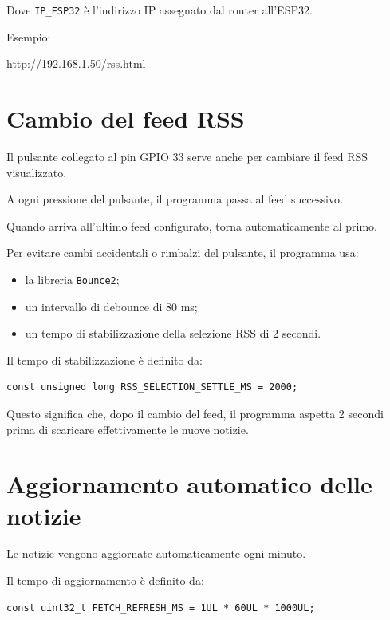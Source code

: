 \documentclass[11pt,a4paper]{article}
\begin{document}
	Dove \texttt{IP\_ESP32} è l'indirizzo IP assegnato dal router all'ESP32.
	
	Esempio:
	
	\begin{center}
		\url{http://192.168.1.50/rss.html}
	\end{center}
	
	\section{Cambio del feed RSS}
	
	Il pulsante collegato al pin GPIO 33 serve anche per cambiare il feed RSS visualizzato.
	
	A ogni pressione del pulsante, il programma passa al feed successivo.
	
	Quando arriva all'ultimo feed configurato, torna automaticamente al primo.
	
	Per evitare cambi accidentali o rimbalzi del pulsante, il programma usa:
	
	\begin{itemize}
		\item la libreria \texttt{Bounce2};
		\item un intervallo di debounce di 80 ms;
		\item un tempo di stabilizzazione della selezione RSS di 2 secondi.
	\end{itemize}
	
	Il tempo di stabilizzazione è definito da:
	
	\begin{lstlisting}[style=codice]
		const unsigned long RSS_SELECTION_SETTLE_MS = 2000;
	\end{lstlisting}
	
	Questo significa che, dopo il cambio del feed, il programma aspetta 2 secondi prima di scaricare effettivamente le nuove notizie.
	
	\section{Aggiornamento automatico delle notizie}
	
	Le notizie vengono aggiornate automaticamente ogni minuto.
	
	Il tempo di aggiornamento è definito da:
	
	\begin{lstlisting}[style=codice]
		const uint32_t FETCH_REFRESH_MS = 1UL * 60UL * 1000UL;
	\end{lstlisting}
	
\end{document}
